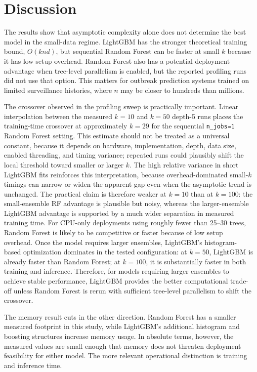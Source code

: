 \documentclass[11pt]{article}
\begin{document}
\FloatBarrier

\section{Discussion}
The results show that asymptotic complexity alone does not determine the best model in the small-data regime. LightGBM has the stronger theoretical training bound, $O(knd)$, but sequential Random Forest can be faster at small $k$ because it has low setup overhead. Random Forest also has a potential deployment advantage when tree-level parallelism is enabled, but the reported profiling runs did not use that option. This matters for outbreak prediction systems trained on limited surveillance histories, where $n$ may be closer to hundreds than millions.

The crossover observed in the profiling sweep is practically important. Linear interpolation between the measured $k=10$ and $k=50$ depth-5 runs places the training-time crossover at approximately $k=29$ for the sequential \texttt{n\_jobs=1} Random Forest setting. This estimate should not be treated as a universal constant, because it depends on hardware, implementation, depth, data size, enabled threading, and timing variance; repeated runs could plausibly shift the local threshold toward smaller or larger $k$. The high relative variance in short LightGBM fits reinforces this interpretation, because overhead-dominated small-$k$ timings can narrow or widen the apparent gap even when the asymptotic trend is unchanged. The practical claim is therefore weaker at $k=10$ than at $k=100$: the small-ensemble RF advantage is plausible but noisy, whereas the larger-ensemble LightGBM advantage is supported by a much wider separation in measured training time. For CPU-only deployments using roughly fewer than 25--30 trees, Random Forest is likely to be competitive or faster because of low setup overhead. Once the model requires larger ensembles, LightGBM's histogram-based optimization dominates in the tested configuration: at $k=50$, LightGBM is already faster than Random Forest; at $k=100$, it is substantially faster in both training and inference. Therefore, for models requiring larger ensembles to achieve stable performance, LightGBM provides the better computational trade-off unless Random Forest is rerun with sufficient tree-level parallelism to shift the crossover.

The memory result cuts in the other direction. Random Forest has a smaller measured footprint in this study, while LightGBM's additional histogram and boosting structures increase memory usage. In absolute terms, however, the measured values are small enough that memory does not threaten deployment feasibility for either model. The more relevant operational distinction is training and inference time.
\end{document}
